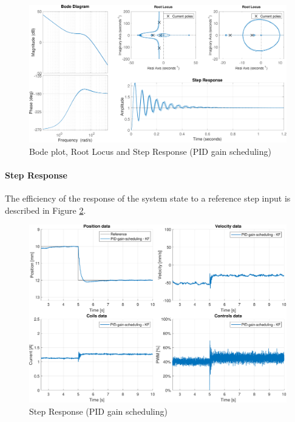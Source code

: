 \begin{figure}[H]
    \centering
    \includegraphics[width=1\linewidth]{./img/MATLAB/controllers/PID_gain_scheduling.pdf}
    \caption{Bode plot, Root Locus and Step Response (PID gain scheduling)}
    \label{fig:pid_gain_scheduling_bode_diagram}
\end{figure}

\paragraph{Step Response}

The efficiency of the response of the system state to a reference step input is described in Figure \ref{fig:pid_gain_scheduling_step_response}.

\begin{figure}[H]
    \centering
    \includegraphics[width=0.8\linewidth]{./img/MATLAB/results/step_PID_gain_scheduling_star.pdf}
    \caption{Step Response (PID gain scheduling)}
    \label{fig:pid_gain_scheduling_step_response}
\end{figure}

